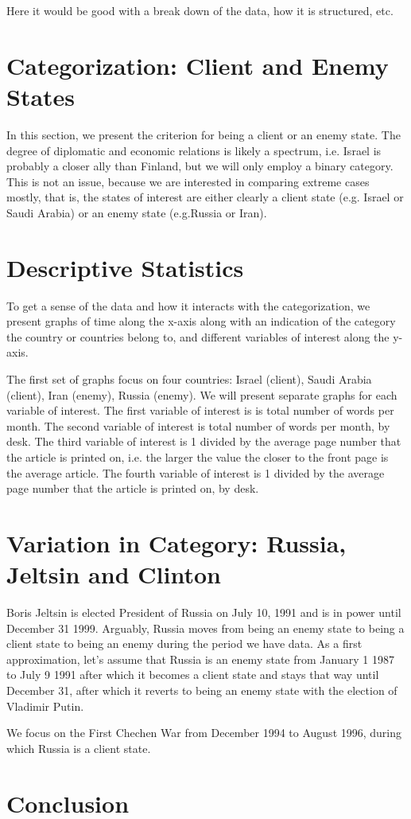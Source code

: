 	Here it would be good with a break down of the data, how it is structured,  etc.
	
	\section{Categorization: Client and Enemy States}
	In this section, we present the criterion for being a client or an enemy state. The degree of diplomatic and economic relations is likely a spectrum, i.e. Israel is probably a closer ally than Finland, but we will only employ a binary category. This is not an issue, because we are interested in comparing extreme cases mostly, that is, the states of interest are either clearly a client state (e.g. Israel or Saudi Arabia) or an enemy state (e.g.Russia or Iran). 
	
	
	
	
	\section{Descriptive Statistics}
	To get a sense of the data and how it interacts with the categorization, we present graphs of time along the x-axis along with an indication of the category the country or countries belong to, and different variables of interest along the y-axis. 
	
	The first set of graphs focus on four countries: Israel (client), Saudi Arabia (client),  Iran (enemy), Russia (enemy). We will present separate graphs for each variable of interest. 
	The first variable of interest is is total number of words per month.
	The second variable of interest is total number of words per month, by desk. 
	The third variable of interest is 1 divided by the average page number that the article is printed on,  i.e. the larger the value the closer to the front page is the average article. 
	The fourth variable of interest is 1 divided by the average page number that the article is printed on,  by desk. 
	
	\section{Variation in Category: Russia, Jeltsin and Clinton}
	Boris Jeltsin is elected President of Russia on July 10, 1991 and is in power until December 31 1999.  Arguably, Russia moves from being an enemy state to being a client state to being an enemy during the period we have data. As a first approximation, let's assume that Russia is an enemy state from January 1 1987 to July 9 1991 after which it becomes a client state and stays that way until December 31,  after which it reverts to being an enemy state with the election of Vladimir Putin. 
	
	We focus on the First Chechen War from December 1994 to August 1996,  during which Russia is a client state. 
	
	
	\section{Conclusion}
	
